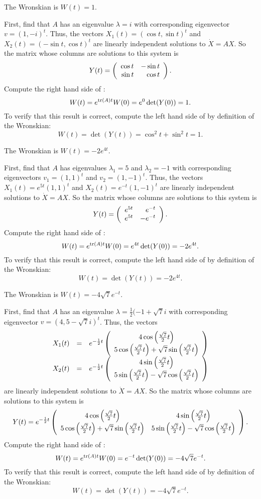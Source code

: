 \documentclass{ximera}
\begin{document}
 \ans The Wronskian is $W(t) = 1$.

\soln First, find that $A$ has an eigenvalue $\lambda = i$ with corresponding
eigenvector $v = (1,-i)^t$.  Thus, the vectors $X_1(t) = (\cos t, \sin t)^t$
and $X_2(t) = (-\sin t, \cos t)^t$ are linearly independent solutions to
$\dot{X} = AX$.  So the matrix whose columns are solutions to this system
is
\[
Y(t) = \left(\begin{array}{rr} \cos t & -\sin t\\ \sin t &\cos t\end{array}\right).
\]
Compute the right hand side of :
\[
W(t) = e^{{\rm tr}(A)t}W(0) = e^0\det(Y(0)) = 1.
\]
To verify that this result is correct, compute the left hand side of
 by definition of the Wronskian:
\[
W(t) = \det(Y(t)) = \cos^2 t + \sin^2 t = 1.
\]

 \ans The Wronskian is $W(t) = -2e^{4t}$.

\soln First, find that $A$ has eigenvalues $\lambda_1 = 5$ and
$\lambda_2 = -1$ with corresponding eigenvectors $v_1 = (1,1)^t$ and
$v_2 = (1,-1)^t$.  Thus, the vectors $X_1(t) = e^{5t}(1,1)^t$ and
$X_2(t) = e^{-t}(1,-1)^t$ are linearly independent solutions to
$\dot{X} = AX$.  So the matrix whose columns are solutions to this
system is
\[
Y(t) = \left(\begin{array}{rr} e^{5t} & e^{-t}\\ e^{5t} &-e^{-t}\end{array}\right).
\]
Compute the right hand side of :
\[
W(t) = e^{{\rm tr}(A)t}W(0) = e^{4t}\det(Y(0)) = -2e^{4t}.
\]
To verify that this result is correct, compute the left hand side of
 by definition of the Wronskian:
\[
W(t) = \det(Y(t)) = -2e^{4t}.
\]

 \ans The Wronskian is $W(t) = -4\sqrt{7}e^{-t}$.

\soln First, find that $A$ has an eigenvalue $\lambda =
\frac{1}{2}(-1 + \sqrt{7}i$ with corresponding
eigenvector $v = (4,5 - \sqrt{7}i)^t$.  Thus, the vectors
\[
\begin{array}{rcl}
X_1(t) & = & e^{-\frac{1}{2}t}\left(\begin{array}{c} 4\cos\left(\frac{\sqrt{7}}{2}t\right) \\ 5\cos\left(\frac{\sqrt{7}}{2}t\right) +
\sqrt{7}\sin\left(\frac{\sqrt{7}}{2}t\right)\end{array}\right) \\
X_2(t) & = & e^{-\frac{1}{2}t}\left(\begin{array}{c} 4\sin\left(\frac{\sqrt{7}}{2}t\right) \\ 5\sin\left(\frac{\sqrt{7}}{2}t\right) -
\sqrt{7}\cos\left(\frac{\sqrt{7}}{2}t\right)\end{array}\right)
\end{array}
\]
are linearly independent solutions to $\dot{X} = AX$.  So the matrix
whose columns are solutions to this system is
\[
Y(t) = e^{-\frac{1}{2}t}\left(\begin{array}{cc} 4\cos\left(\frac{\sqrt{7}}{2}t\right) & 4\sin\left(\frac{\sqrt{7}}{2}t\right)\\ 5\cos\left(\frac{\sqrt{7}}{2}t\right) +
\sqrt{7}\sin\left(\frac{\sqrt{7}}{2}t\right) &5\sin\left(\frac{\sqrt{7}}{2}t\right) -
\sqrt{7}\cos\left(\frac{\sqrt{7}}{2}t\right)\end{array}\right).
\]
Compute the right hand side of :
\[
W(t) = e^{{\rm tr}(A)t}W(0) = e^{-t}\det(Y(0)) = -4\sqrt{7}e^{-t}.
\]
To verify that this result is correct, compute the left hand side of
 by definition of the Wronskian:
\[
W(t) = \det(Y(t)) = -4\sqrt{7}e^{-t}.
\]
\end{document}
